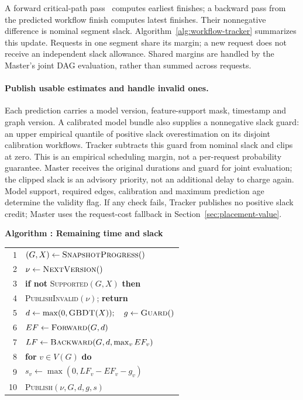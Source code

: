 A forward critical-path pass~\cite{kelley1959cpm} computes earliest
finishes; a backward pass from the predicted workflow finish computes
latest finishes. Their nonnegative difference is nominal segment slack.
Algorithm~\ref{alg:workflow-tracker} summarizes this update. Requests in one
segment share its margin; a new request does not receive an independent
slack allowance. Shared margins are handled by the Master's joint DAG
evaluation, rather than summed across requests.

\paragraph{Publish usable estimates and handle invalid ones.}
Each prediction carries a model version, feature-support mask, timestamp
and graph version. A calibrated model bundle also supplies a nonnegative
slack guard: an upper empirical quantile of positive slack overestimation
on its disjoint calibration workflows. Tracker subtracts this guard from
nominal slack and clips at zero. This is an empirical scheduling margin,
not a per-request probability guarantee. Master receives the original
durations and guard for joint evaluation; the clipped slack is an advisory
priority, not an additional delay to charge again. Model support, required edges,
calibration and maximum prediction age determine the validity flag.
If any check fails, Tracker publishes no positive slack credit; Master
uses the request-cost fallback in Section~\ref{sec:placement-value}.

\par\medskip\noindent\begin{minipage}{\columnwidth}
\raggedright
 \label{alg:workflow-tracker}
 \textbf{Algorithm \thedesignalgorithm: Remaining time and slack}
 \par\smallskip
 \begin{tabularx}{\columnwidth}{@{}r@{\quad}X@{}}
 \toprule
 1 & $(G,X)\gets\textsc{SnapshotProgress}()$ \\
 2 & $\nu\gets\textsc{NextVersion}()$ \\
 3 & \textbf{if not} \textsc{Supported}$(G,X)$ \textbf{then} \\
 4 & \quad \textsc{PublishInvalid}$(\nu)$; \textbf{return} \\
 5 & $d\gets\max(0,\textsc{GBDT}(X));\quad g\gets\textsc{Guard}()$ \\
 6 & $EF\gets\textsc{Forward}(G,d)$ \\
 7 & $LF\gets\textsc{Backward}(G,d,\max_v EF_v)$ \\
 8 & \textbf{for} $v\in V(G)$ \textbf{do} \\
 9 & \quad $s_v\gets\max(0,LF_v-EF_v-g_v)$ \\
 10 & \textsc{Publish}$(\nu,G,d,g,s)$ \\
 \bottomrule
 \end{tabularx}
\end{minipage}\par\medskip

